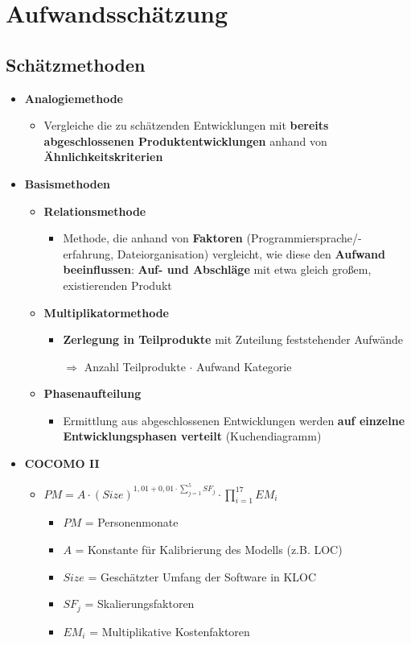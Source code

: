 \section{Aufwandsschätzung}
	
\subsection{Schätzmethoden}
		
\begin{itemize}
\item \textbf{Analogiemethode}
\begin{itemize}
\item Vergleiche die zu schätzenden Entwicklungen mit \textbf{bereits abgeschlossenen Produktentwicklungen} anhand von \textbf{Ähnlichkeitskriterien}
\end{itemize}
\item \textbf{\textbf{Basismethoden}}
\begin{itemize}
\item \textbf{Relationsmethode}
\begin{itemize}
\item Methode, die anhand von \textbf{Faktoren} (Programmiersprache/-erfahrung, Dateiorganisation) vergleicht, wie diese den \textbf{Aufwand beeinflussen}: \textbf{Auf- und Abschläge} mit etwa gleich großem, existierenden Produkt
\end{itemize}
\item \textbf{Multiplikatormethode}
\begin{itemize}
\item \textbf{Zerlegung in Teilprodukte} mit Zuteilung feststehender Aufwände
					
$\Rightarrow$ Anzahl Teilprodukte {\Large $\cdot$} Aufwand Kategorie
\end{itemize}
\item \textbf{Phasenaufteilung}
\begin{itemize}
\item Ermittlung aus abgeschlossenen Entwicklungen werden \textbf{auf einzelne Entwicklungsphasen verteilt} (Kuchendiagramm)
\end{itemize}
\end{itemize}
\item \textbf{COCOMO II}
\begin{itemize}
\item {\LARGE $PM = A \cdot (Size)^{1,01 + 0,01 \cdot {\sum_{j=1}^{5} SF_{j}}} \cdot \prod_{i=1}^{17} EM_{i}$}
\begin{itemize}
\item $PM$ = Personenmonate
\item $A$ = Konstante für Kalibrierung des Modells (z.B. LOC)
\item $Size$ = Geschätzter Umfang der Software in KLOC
\item $SF_{j}$ = Skalierungsfaktoren
\item $EM_{i}$ = Multiplikative Kostenfaktoren
\end{itemize}
\end{itemize}
\end{itemize}